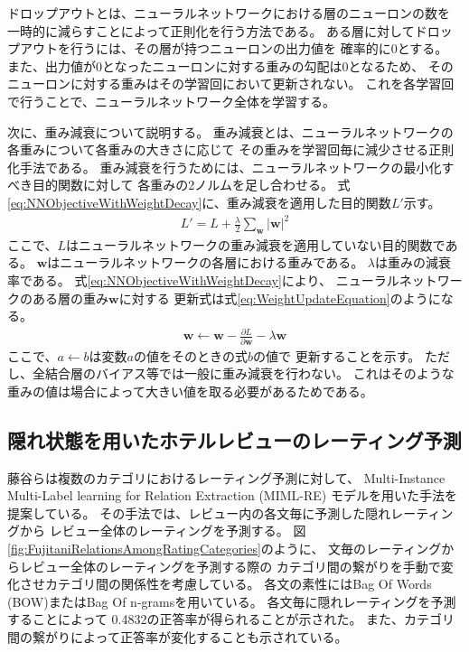 ドロップアウトとは、ニューラルネットワークにおける層のニューロンの数を
一時的に減らすことによって正則化を行う方法である。
ある層に対してドロップアウトを行うには、その層が持つニューロンの出力値を
確率的に0とする。
また、出力値が0となったニューロンに対する重みの勾配は0となるため、
そのニューロンに対する重みはその学習回において更新されない。
これを各学習回で行うことで、ニューラルネットワーク全体を学習する。

次に、重み減衰について説明する。
重み減衰とは、ニューラルネットワークの各重みについて各重みの大きさに応じて
その重みを学習回毎に減少させる正則化手法である。
重み減衰を行うためには、ニューラルネットワークの最小化すべき目的関数に対して
各重みの2ノルムを足し合わせる。
式\ref{eq:NNObjectiveWithWeightDecay}に、重み減衰を適用した目的関数$L'$示す。
\begin{gather} \label{eq:NNObjectiveWithWeightDecay}
  L' = L + \frac{\lambda}{2} \sum_{\mathbf{w}} {|\mathbf{w}|}^2
\end{gather}
ここで、$L$はニューラルネットワークの重み減衰を適用していない目的関数である。
$\mathbf{w}$はニューラルネットワークの各層における重みである。
$\lambda$は重みの減衰率である。
式\ref{eq:NNObjectiveWithWeightDecay}により、
ニューラルネットワークのある層の重み$\mathbf{w}$に対する
更新式は式\ref{eq:WeightUpdateEquation}のようになる。
\begin{gather} \label{eq:WeightUpdateEquation}
  \mathbf{w} \leftarrow \mathbf{w} - \frac{\partial L}{\partial \mathbf{w}}
                                   - \lambda \mathbf{w}
\end{gather}
ここで、$a \leftarrow b$は変数$a$の値をそのときの式$b$の値で
更新することを示す。
ただし、全結合層のバイアス等では一般に重み減衰を行わない。
これはそのような重みの値は場合によって大きい値を取る必要があるためである。


\subsection{隠れ状態を用いたホテルレビューのレーティング予測}

藤谷ら\cite{fujitani15}は複数のカテゴリにおけるレーティング予測に対して、
Multi-Instance Multi-Label learning for Relation Extraction (MIML-RE)
\cite{mihai12}モデルを用いた手法を提案している。
その手法では、レビュー内の各文毎に予測した隠れレーティングから
レビュー全体のレーティングを予測する。
図\ref{fig:FujitaniRelationsAmongRatingCategories}のように、
文毎のレーティングからレビュー全体のレーティングを予測する際の
カテゴリ間の繋がりを手動で変化させカテゴリ間の関係性を考慮している。
各文の素性にはBag Of Words (BOW)またはBag Of n-gramsを用いている。
各文毎に隠れレーティングを予測することによって
0.4832の正答率が得られることが示された。
また、カテゴリ間の繋がりによって正答率が変化することも示されている。

